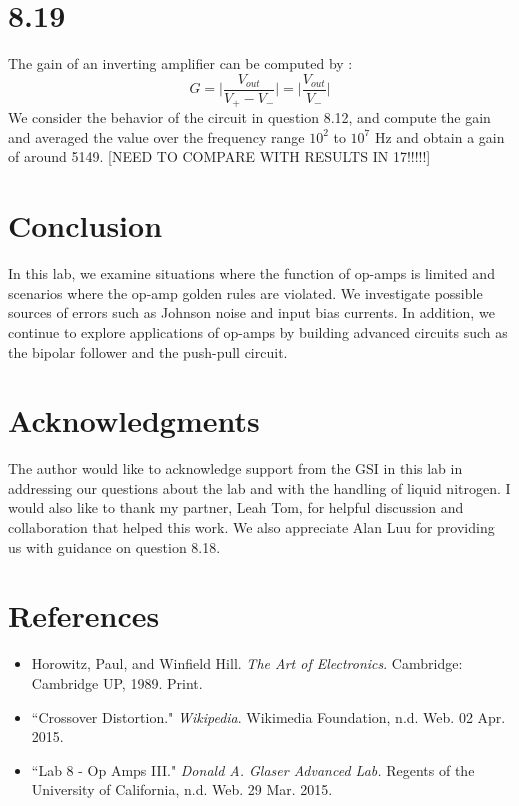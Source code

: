 \documentclass[authoryear, 12pt,5p, times]{elsarticle}
\begin{document}
\section*{8.19}
The gain of an inverting amplifier can be computed by : 
\begin{equation}
G = \Bigg |\frac{V_{out}}{V_+ - V_-}\Bigg |=\Bigg |\frac{V_{out}}{ V_-}\Bigg |
\end{equation} 
We consider the behavior of the circuit in question 8.12, and compute the gain and averaged the value over the frequency range $10^2$ to $10^7$ Hz and obtain a gain of around 5149. [NEED TO COMPARE WITH RESULTS IN 17!!!!!] 
\section*{Conclusion}
In this lab, we examine situations where the function of op-amps is limited and scenarios where the op-amp golden rules are violated. We investigate possible sources of errors such as Johnson noise and input bias currents. In addition, we continue to explore applications of op-amps by building advanced circuits such as the bipolar follower and the push-pull circuit.
 \section*{Acknowledgments}
\begin{footnotesize}
The author would like to acknowledge support from the GSI in this lab in addressing our questions about the lab and with the handling of liquid nitrogen. I would also like to thank my partner, Leah Tom, for helpful discussion and collaboration that helped this work. We also appreciate Alan Luu for providing us with guidance on question 8.18.
\end{footnotesize}
  \section*{References}
 \begin{footnotesize}
 \begin{itemize}
 \item Horowitz, Paul, and Winfield Hill. \textit{The Art of Electronics}. Cambridge: Cambridge UP, 1989. Print.
\item ``Crossover Distortion." \textit{Wikipedia}. Wikimedia Foundation, n.d. Web. 02 Apr. 2015.
 \item ``Lab 8 - Op Amps III." \textit{Donald A. Glaser Advanced Lab.} Regents of the University of California, n.d. Web. 29 Mar. 2015.
\end{itemize} 
  \end{footnotesize}
\end{document}
